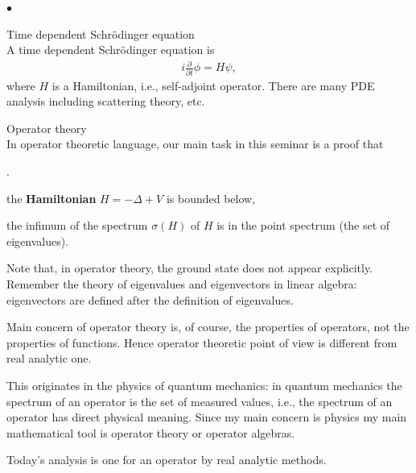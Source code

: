 \documentclass[openany, a4paper, oneside]{jsbook}
\newcounter{enum2}
\renewenvironment{enumerate}{%
\begin{list}%
{%
\arabic{enum2}.\ \,%
}%
{%
\usecounter{enum2}
\setlength{\itemindent}{0pt}%
\setlength{\leftmargin}{15pt}%
\setlength{\rightmargin}{0pt}%
\setlength{\labelsep}{0pt}%
\setlength{\labelwidth}{6pt}%
\setlength{\itemsep}{0pt}%
\setlength{\parsep}{0pt}%
\setlength{\listparindent}{0pt}%
}
}{%
\end{list}%
}
\renewenvironment{itemize}{%
\begin{list}{$\bullet$\ \ }%
{%
\usecounter{enum2}
\setlength{\itemindent}{0pt}%
\setlength{\leftmargin}{15pt}%
\setlength{\rightmargin}{0pt}%
\setlength{\labelsep}{0pt}%
\setlength{\labelwidth}{6pt}%
\setlength{\itemsep}{0pt}%
\setlength{\parsep}{0pt}%
\setlength{\listparindent}{0pt}%
}
}{%
\end{list}%
}
\theoremstyle{break}
\theoremstyle{breakdefn}
\begin{document}
\begin{itemize}

\item Time dependent Schr\"odinger equation\\
%
A time dependent Schr\"odinger equation is
\begin{align}
 i \frac{\partial}{\partial t} \phi = H \psi,
\end{align}
where $H$ is a Hamiltonian, i.e., self-adjoint operator.
There are many PDE analysis including scattering theory, etc.

\item Operator theory\\
%
In operator theoretic language, our main task in this seminar is a proof that
\begin{enumerate}
\item the \textbf{Hamiltonian} $H = - \Delta + V$ is bounded below,
\item the infimum of the spectrum $\sigma (H)$ of $H$ is in the point spectrum (the set of eigenvalues).
\end{enumerate}
Note that, in operator theory, the ground state does not appear explicitly.
Remember the theory of eigenvalues and eigenvectors in linear algebra:
eigenvectors are defined after the definition of eigenvalues.

Main concern of operator theory is, of course, the properties of operators, not the properties of functions.
Hence operator theoretic point of view is different from real analytic one.

This originates in the physics of quantum mechanics:
in quantum mechanics the spectrum of an operator is the set of measured values, i.e.,
the spectrum of an operator has direct physical meaning.
Since my main concern is physics my main mathematical tool is operator theory or operator algebras.

Today's analysis is one for an operator by real analytic methods.


\end{itemize}
\end{document}
